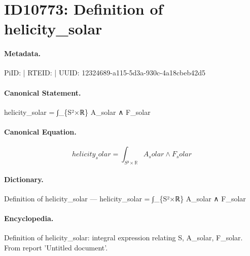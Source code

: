 \section*{ID10773: Definition of helicity\_solar}
\paragraph{Metadata.}
PiID:  | RTEID:  | UUID: 12324689-a115-5d3a-930c-4a18cbeb42d5

\paragraph{Canonical Statement.}
helicity\_solar = ∫\_\{S²×ℝ\} A\_solar ∧ F\_solar

\paragraph{Canonical Equation.}
\[
helicity_solar = ∫_{S²×ℝ} A_solar ∧ F_solar
\]

\paragraph{Dictionary.}
Definition of helicity\_solar — helicity\_solar = ∫\_\{S²×ℝ\} A\_solar ∧ F\_solar

\paragraph{Encyclopedia.}
Definition of helicity\_solar: integral expression relating S, A\_solar, F\_solar. From report 'Untitled document'.
